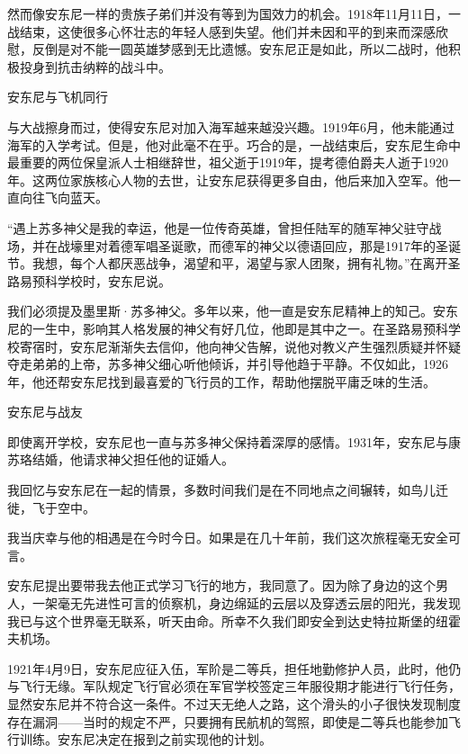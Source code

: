 然而像安东尼一样的贵族子弟们并没有等到为国效力的机会。1918年11月11日，一战结束，这使很多心怀壮志的年轻人感到失望。他们并未因和平的到来而深感欣慰，反倒是对不能一圆英雄梦感到无比遗憾。安东尼正是如此，所以二战时，他积极投身到抗击纳粹的战斗中。

{\startalignment[center]
 \stopalignment}
安东尼与飞机同行

与大战擦身而过，使得安东尼对加入海军越来越没兴趣。1919年6月，他未能通过海军的入学考试。但是，他对此毫不在乎。巧合的是，一战结束后，安东尼生命中最重要的两位保皇派人士相继辞世，祖父逝于1919年，提考德伯爵夫人逝于1920年。这两位家族核心人物的去世，让安东尼获得更多自由，他后来加入空军。他一直向往飞向蓝天。

“遇上苏多神父是我的幸运，他是一位传奇英雄，曾担任陆军的随军神父驻守战场，并在战壕里对着德军唱圣诞歌，而德军的神父以德语回应，那是1917年的圣诞节。我想，每个人都厌恶战争，渴望和平，渴望与家人团聚，拥有礼物。”在离开圣路易预科学校时，安东尼说。

我们必须提及墨里斯·苏多神父。多年以来，他一直是安东尼精神上的知己。安东尼的一生中，影响其人格发展的神父有好几位，他即是其中之一。在圣路易预科学校寄宿时，安东尼渐渐失去信仰，他向神父告解，说他对教义产生强烈质疑并怀疑夺走弟弟的上帝，苏多神父细心听他倾诉，并引导他趋于平静。不仅如此，1926年，他还帮安东尼找到最喜爱的飞行员的工作，帮助他摆脱平庸乏味的生活。

{\startalignment[center]
 \stopalignment}
安东尼与战友

即使离开学校，安东尼也一直与苏多神父保持着深厚的感情。1931年，安东尼与康苏珞结婚，他请求神父担任他的证婚人。


\stoptitle

\starttitle[title={6}]

我回忆与安东尼在一起的情景，多数时间我们是在不同地点之间辗转，如鸟儿迁徙，飞于空中。

我当庆幸与他的相遇是在今时今日。如果是在几十年前，我们这次旅程毫无安全可言。

安东尼提出要带我去他正式学习飞行的地方，我同意了。因为除了身边的这个男人，一架毫无先进性可言的侦察机，身边绵延的云层以及穿透云层的阳光，我发现我已与这个世界毫无联系，听天由命。所幸不久我们即安全到达史特拉斯堡的纽霍夫机场。

1921年4月9日，安东尼应征入伍，军阶是二等兵，担任地勤修护人员，此时，他仍与飞行无缘。军队规定飞行官必须在军官学校签定三年服役期才能进行飞行任务，显然安东尼并不符合这一条件。不过天无绝人之路，这个滑头的小子很快发现制度存在漏洞------当时的规定不严，只要拥有民航机的驾照，即使是二等兵也能参加飞行训练。安东尼决定在报到之前实现他的计划。

